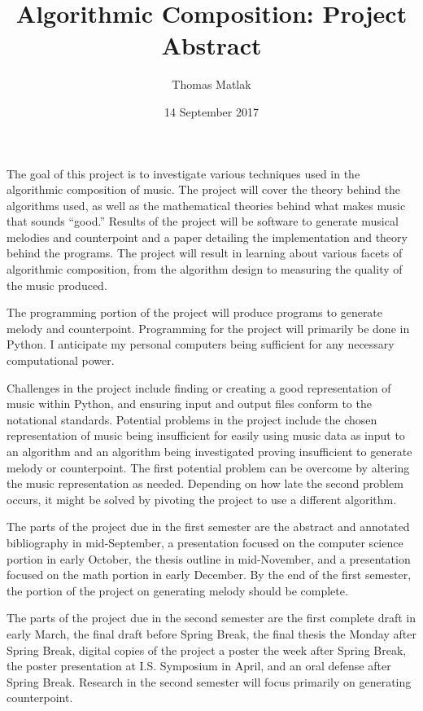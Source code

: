 \documentclass[12pt]{article}
\title{Algorithmic Composition: Project Abstract}
\author{Thomas Matlak}
\date{14 September 2017}
\begin{document}
	\maketitle
	
	The goal of this project is to investigate various techniques used in the algorithmic composition of music. The project will cover the theory behind the algorithms used, as well as the mathematical theories behind what makes music that sounds ``good.'' Results of the project will be software to generate musical melodies and counterpoint and a paper detailing the implementation and theory behind the programs. The project will result in learning about various facets of algorithmic composition, from the algorithm design to measuring the quality of the music produced.
	
	The programming portion of the project will produce programs to generate melody and counterpoint. Programming for the project will primarily be done in Python. I anticipate my personal computers being sufficient for any necessary computational power.
	
	Challenges in the project include finding or creating a good representation of music within Python, and ensuring input and output files conform to the notational standards. Potential problems in the project include the chosen representation of music being insufficient for easily using music data as input to an algorithm and an algorithm being investigated proving insufficient to generate melody or counterpoint. The first potential problem can be overcome by altering the music representation as needed. Depending on how late the second problem occurs, it might be solved by pivoting the project to use a different algorithm.
	
	The parts of the project due in the first semester are the abstract and annotated bibliography in mid-September, a presentation focused on the computer science portion in early October, the thesis outline in mid-November, and a presentation focused on the math portion in early December. By the end of the first semester, the portion of the project on generating melody should be complete.
	
	The parts of the project due in the second semester are the first complete draft in early March, the final draft before Spring Break, the final thesis the Monday after Spring Break, digital copies of the project a poster the week after Spring Break, the poster presentation at I.S. Symposium in April, and an oral defense after Spring Break. Research in the second semester will focus primarily on generating counterpoint.
	
	\nocite{*}
	
	
	
\end{document}
